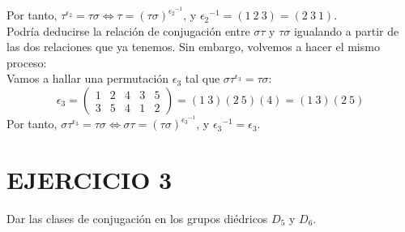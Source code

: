 \documentclass{article}
\begin{document}
Por tanto, $\tau^{\epsilon_2} = \tau \sigma \iff \tau = (\tau \sigma)^{{\epsilon_2}^{-1}}$, y ${\epsilon_2}^{-1} = (1 \ 2 \ 3) = (2 \ 3 \ 1)$.\\
Podría deducirse la relación de conjugación entre $\sigma \tau$ y $\tau \sigma$ igualando a partir de las dos relaciones que ya tenemos. Sin embargo, volvemos a hacer el mismo proceso:\\
Vamos a hallar una permutación $\epsilon_3$ tal que $\sigma\tau^{\epsilon_3} = \tau \sigma$:\\
$$
\epsilon_3 = \left(
  \begin{array}{ccccc}
    1 & 2 & 4 & 3 & 5 \\
    3 & 5 & 4 & 1 & 2
\end{array} \right) = (1 \ 3)(2 \ 5)(4) = (1 \ 3)(2 \ 5)
$$
Por tanto, $\sigma\tau^{\epsilon_3} = \tau \sigma \iff \sigma\tau = (\tau \sigma)^{{\epsilon_3}^{-1}}$, y ${\epsilon_3}^{-1} = \epsilon_3$.

\section*{EJERCICIO 3}

Dar las clases de conjugación en los grupos diédricos $D_5$ y $D_6$.\\
\end{document}
